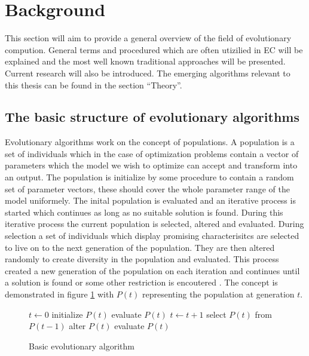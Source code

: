 \section{Background}

This section will aim to provide a general overview of the field of evolutionary compution. General terms and procedured which are often utizilied in EC will be explained and the most well known traditional approaches will be presented. Current research will also be introduced. The emerging algorithms relevant to this thesis can be found in the section ``Theory''.

\subsection{The basic structure of evolutionary algorithms}

Evolutionary algorithms work on the concept of populations. A population is a set of individuals which in the case of optimization problems contain a vector of parameters which the model we wish to optimize can accept and transform into an output. The population is initialize by some procedure to contain a random set of parameter vectors, these should cover the whole parameter range of the model uniformely. The inital population is evaluated and an iterative process is started which continues as long as no suitable solution is found. During this iterative process the current population is selected, altered and evaluated. During selection a set of individuals which display promising characterisitcs are selected to live on to the next generation of the population. They are then altered randomly to create diversity in the population and evaluated. This process created a new generation of the population on each iteration and continues until a solution is found or some other restriction is encoutered \cite{Eiben20021}. The concept is demonstrated in figure \ref{algo:basicevolution} with $P(t)$ representing the population at generation $t$.

\begin{figure}[h]
  \centering
  \begin{minipage}{7.5cm}
    \begin{algorithmic}
       \State $t\gets 0$
       \State initialize $P(t)$
       \State evaluate $P(t)$
        \State $t\gets t + 1$
        \State select $P(t)$ from $P(t-1)$
        \State alter $P(t)$
        \State evaluate $P(t)$
       \EndWhile
    \end{algorithmic}
  \end{minipage}
  \caption{Basic evolutionary algorithm}
  \label{algo:basicevolution}
\end{figure}


